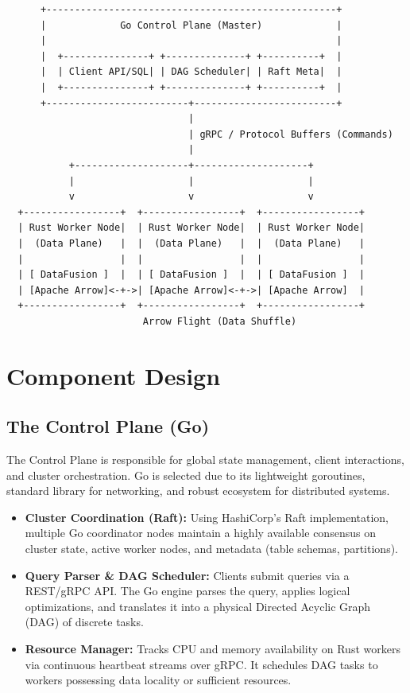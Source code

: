 \documentclass[11pt, a4paper]{article}
\begin{document}
\begin{verbatim}
      +---------------------------------------------------+
      |             Go Control Plane (Master)             |
      |                                                   |
      |  +---------------+ +--------------+ +----------+  |
      |  | Client API/SQL| | DAG Scheduler| | Raft Meta|  |
      |  +---------------+ +--------------+ +----------+  |
      +-------------------------+-------------------------+
                                |
                                | gRPC / Protocol Buffers (Commands)
                                |
           +--------------------+--------------------+
           |                    |                    |
           v                    v                    v
  +-----------------+  +-----------------+  +-----------------+
  | Rust Worker Node|  | Rust Worker Node|  | Rust Worker Node|
  |  (Data Plane)   |  |  (Data Plane)   |  |  (Data Plane)   |
  |                 |  |                 |  |                 |
  | [ DataFusion ]  |  | [ DataFusion ]  |  | [ DataFusion ]  |
  | [Apache Arrow]<-+->| [Apache Arrow]<-+->| [Apache Arrow]  |
  +-----------------+  +-----------------+  +-----------------+
                        Arrow Flight (Data Shuffle)
\end{verbatim}

\section{Component Design}

\subsection{The Control Plane (Go)}
The Control Plane is responsible for global state management, client interactions, and cluster orchestration. Go is selected due to its lightweight goroutines, standard library for networking, and robust ecosystem for distributed systems.

\begin{itemize}
    \item \textbf{Cluster Coordination (Raft):} Using HashiCorp's Raft implementation, multiple Go coordinator nodes maintain a highly available consensus on cluster state, active worker nodes, and metadata (table schemas, partitions).
    \item \textbf{Query Parser \& DAG Scheduler:} Clients submit queries via a REST/gRPC API. The Go engine parses the query, applies logical optimizations, and translates it into a physical Directed Acyclic Graph (DAG) of discrete tasks.
    \item \textbf{Resource Manager:} Tracks CPU and memory availability on Rust workers via continuous heartbeat streams over gRPC. It schedules DAG tasks to workers possessing data locality or sufficient resources.
\end{itemize}
\end{document}
